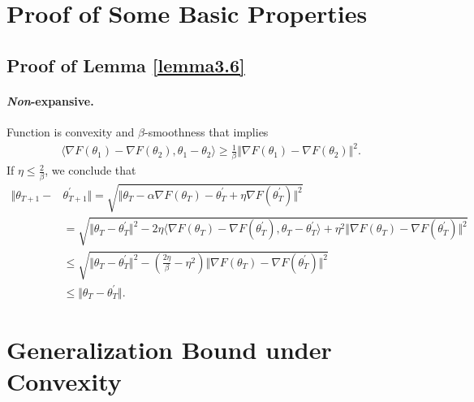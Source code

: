 \section{Proof of Some Basic Properties}
\label{sec:app-a}



\subsection{Proof of Lemma \ref{lemma3.6}}\label{pro-lemma}  

\paragraph{\emph{Non}-expansive.} Function is convexity and $\beta$-smoothness that implies 
\begin{equation}\label{eq:app2.2}
     \begin{aligned}
      \langle \nabla F(\theta_1) -\nabla F(\theta_2), \theta_1 - \theta_2 \rangle \geq \frac{1}{\beta} \Vert \nabla F(\theta_1) -\nabla F(\theta_2)\Vert^2 .
     \end{aligned}
\end{equation}
If $\eta \leq \frac{2}{\beta}$, we conclude that
\begin{equation}\label{eq:app2.3}
     \begin{aligned}
      \Vert \theta_{T+1} - &\theta_{T+1}^{\prime}\Vert = \sqrt{\Vert \theta_{T} - \alpha \nabla F(\theta_{T}) - \theta_{T}^{\prime} + \eta \nabla F(\theta_{T}^{\prime})\Vert^2}  \\
      &=\sqrt{\Vert \theta_{T} - \theta_{T}^{\prime} \Vert^2 - 2\eta\langle \nabla F(\theta_{T}) -\nabla F(\theta_{T}^{\prime}), \theta_T- \theta_T^{\prime} \rangle +\eta^2 \Vert \nabla F(\theta_{T}) - \nabla F(\theta_{T}^{\prime})\Vert^2} \\
      &\leq \sqrt{\Vert \theta_T- \theta_T^{\prime}\Vert^2 - \left(\frac{2\eta}{\beta} -\eta^2 \right) \Vert \nabla F(\theta_{T}) -\nabla F(\theta_{T}^{\prime})\Vert^2} \\
      &\leq \Vert \theta_T- \theta_T^{\prime}\Vert.
     \end{aligned}
\end{equation}


\section{Generalization Bound under Convexity}\label{sec:app-convex}

